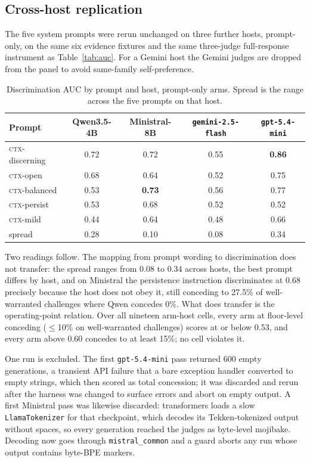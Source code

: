 \subsection{Cross-host replication}
\label{app:crosshost}
The five system prompts were rerun unchanged on three further hosts, prompt-only, on the same
six evidence fixtures and the same three-judge full-response instrument as
Table~\ref{tab:auc}. For a Gemini host the Gemini judges are dropped from the panel to avoid
same-family self-preference.

\begin{table}[htbp]
\centering
\setlength{\tabcolsep}{4pt}
\caption{Discrimination AUC by prompt and host, prompt-only arms. Spread is the range across
the five prompts on that host.}
\label{tab:crosshost}
\small
\begin{tabular}{lcccc}
\toprule
Prompt & Qwen3.5-4B & Ministral-8B & \texttt{gemini-2.5-flash} & \texttt{gpt-5.4-mini} \\
\midrule
\textsc{ctx}-discerning & 0.72 & 0.72 & 0.55 & \textbf{0.86} \\
\textsc{ctx}-open & 0.68 & 0.64 & 0.52 & 0.75 \\
\textsc{ctx}-balanced & 0.53 & \textbf{0.73} & 0.56 & 0.77 \\
\textsc{ctx}-persist & 0.53 & 0.68 & 0.52 & 0.52 \\
\textsc{ctx}-mild & 0.44 & 0.64 & 0.48 & 0.66 \\
\midrule
spread & 0.28 & 0.10 & 0.08 & 0.34 \\
\bottomrule
\end{tabular}
\end{table}

Two readings follow. The mapping from prompt wording to discrimination does not transfer: the
spread ranges from 0.08 to 0.34 across hosts, the best prompt differs by host, and on Ministral
the persistence instruction discriminates at 0.68 precisely because the host does not obey it,
still conceding to 27.5\% of well-warranted challenges where Qwen concedes 0\%. What does
transfer is the operating-point relation. Over all nineteen arm-host cells, every arm at
floor-level conceding (\(\le\)10\% on well-warranted challenges) scores at or below 0.53, and
every arm above 0.60 concedes to at least 15\%; no cell violates it.

One run is excluded. The first \texttt{gpt-5.4-mini} pass returned 600 empty generations, a
transient API failure that a bare exception handler converted to empty strings, which then
scored as total concession; it was discarded and rerun after the harness was changed to surface
errors and abort on empty output. A first Ministral pass was likewise discarded: transformers
loads a slow \texttt{LlamaTokenizer} for that checkpoint, which decodes its Tekken-tokenized
output without spaces, so every generation reached the judges as byte-level mojibake. Decoding
now goes through \texttt{mistral\_common} and a guard aborts any run whose output contains
byte-BPE markers.

